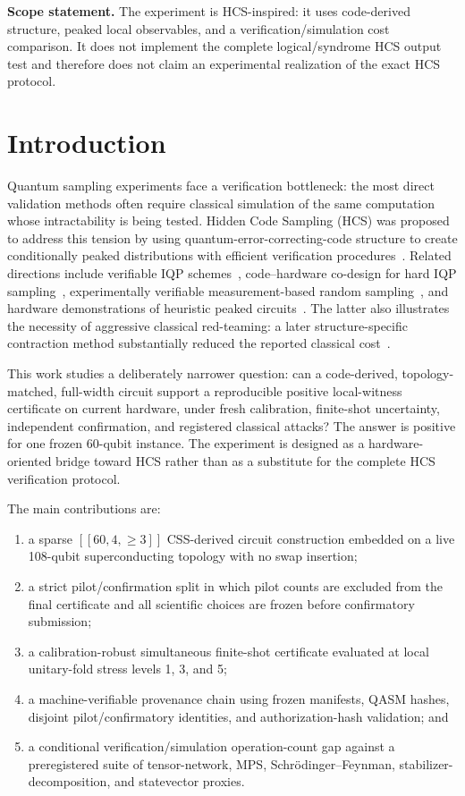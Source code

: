 \documentclass[11pt]{article}
\begin{document}
\noindent\textbf{Scope statement.}
The experiment is HCS-inspired: it uses code-derived structure, peaked local observables, and a verification/simulation cost comparison. It does not implement the complete logical/syndrome HCS output test and therefore does not claim an experimental realization of the exact HCS protocol.

\section{Introduction}
Quantum sampling experiments face a verification bottleneck: the most direct validation methods often require classical simulation of the same computation whose intractability is being tested. Hidden Code Sampling (HCS) was proposed to address this tension by using quantum-error-correcting-code structure to create conditionally peaked distributions with efficient verification procedures~\cite{deshpande2025hcs}. Related directions include verifiable IQP schemes~\cite{bremner2025stabilizer}, code--hardware co-design for hard IQP sampling~\cite{hangleiter2024hypercube}, experimentally verifiable measurement-based random sampling~\cite{ringbauer2024randomsampling}, and hardware demonstrations of heuristic peaked circuits~\cite{gharibyan2025peaked}. The latter also illustrates the necessity of aggressive classical red-teaming: a later structure-specific contraction method substantially reduced the reported classical cost~\cite{kremer2026peaked}.

This work studies a deliberately narrower question: can a code-derived, topology-matched, full-width circuit support a reproducible positive local-witness certificate on current hardware, under fresh calibration, finite-shot uncertainty, independent confirmation, and registered classical attacks? The answer is positive for one frozen 60-qubit instance. The experiment is designed as a hardware-oriented bridge toward HCS rather than as a substitute for the complete HCS verification protocol.

The main contributions are:
\begin{enumerate}
  \item a sparse $[[60,4,\geq3]]$ CSS-derived circuit construction embedded on a live 108-qubit superconducting topology with no swap insertion;
  \item a strict pilot/confirmation split in which pilot counts are excluded from the final certificate and all scientific choices are frozen before confirmatory submission;
  \item a calibration-robust simultaneous finite-shot certificate evaluated at local unitary-fold stress levels 1, 3, and 5;
  \item a machine-verifiable provenance chain using frozen manifests, QASM hashes, disjoint pilot/confirmatory identities, and authorization-hash validation; and
  \item a conditional verification/simulation operation-count gap against a preregistered suite of tensor-network, MPS, Schr\"odinger--Feynman, stabilizer-decomposition, and statevector proxies.
\end{enumerate}
\end{document}
